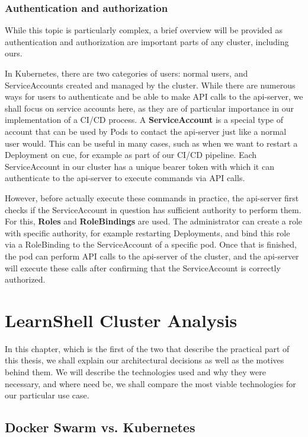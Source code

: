 \documentclass[thesis=B,english]{FITthesis}[2019/12/23]
\begin{document}
\subsection{Authentication and authorization}

While this topic is particularly complex, a brief overview will be provided as authentication and authorization are important parts of any cluster, including ours.

In Kubernetes, there are two categories of users: normal users, and ServiceAccounts created and managed by the cluster. While there are numerous ways for users to authenticate and be able to make API calls to the api-server, we shall focus on service accounts here, as they are of particular importance in our implementation of a CI/CD process. A \textbf{ServiceAccount} is a special type of account that can be used by Pods to contact the api-server just like a normal user would. This can be useful in many cases, such as when we want to restart a Deployment on cue, for example as part of our CI/CD pipeline. Each ServiceAccount in our cluster has a unique bearer token with which it can authenticate to the api-server to execute commands via API calls.

However, before actually execute these commands in practice, the api-server first checks if the ServiceAccount in question has sufficient authority to perform them. For this, \textbf{Roles} and \textbf{RoleBindings} are used. The administrator can create a role with specific authority, for example restarting Deployments, and bind this role via a RoleBinding to the ServiceAccount of a specific pod. Once that is finished, the pod can perform API calls to the api-server of the cluster, and the api-server will execute these calls after confirming that the ServiceAccount is correctly authorized.


\chapter{LearnShell Cluster Analysis}

In this chapter, which is the first of the two that describe the practical part of this thesis, we shall explain our architectural decisions as well as the motives behind them. We will describe the technologies used and why they were necessary, and where need be, we shall compare the most viable technologies for our particular use case.

\clearpage

\section{Docker Swarm vs. Kubernetes}
\end{document}
